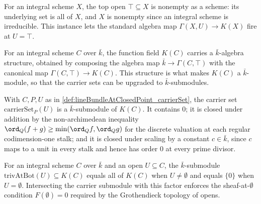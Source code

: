 \begin{definition}
  \label{def:lineBundleAtClosedPoint_instNonemptyTopOpen}
  For an integral scheme \(X\), the top open \(\top \subseteq X\) is nonempty
  as a scheme: its underlying set is all of \(X\), and \(X\) is nonempty since
  an integral scheme is irreducible. This instance lets the standard algebra
  map \(\Gamma(X, U) \to K(X)\) fire at \(U = \top\).
\end{definition}

\begin{definition}
  \label{def:lineBundleAtClosedPoint_instAlgebraKbarFunctionField}
  For an integral scheme \(C\) over \(\bar k\), the function field \(K(C)\)
  carries a \(\bar k\)-algebra structure, obtained by composing the algebra
  map \(\bar k \to \Gamma(C, \top)\) with the canonical map
  \(\Gamma(C, \top) \to K(C)\). This structure is what makes \(K(C)\) a
  \(\bar k\)-module, so that the carrier sets can be upgraded to
  \(\bar k\)-submodules.
\end{definition}

\begin{definition}
  \label{def:lineBundleAtClosedPoint_carrierSubmodule}
  With \(C, P, U\) as in \cref{def:lineBundleAtClosedPoint_carrierSet}, the
  carrier set \(\mathrm{carrierSet}_P(U)\) is a \(\bar k\)-submodule of
  \(K(C)\). It contains \(0\); it is closed under addition by the
  non-archimedean inequality \(\ord_Q(f + g) \ge \min(\ord_Q f, \ord_Q g)\)
  for the discrete valuation at each regular codimension-one stalk; and it is
  closed under scaling by a constant \(c \in \bar k\), since \(c\) maps to a
  unit in every stalk and hence has order \(0\) at every prime divisor.
\end{definition}

\begin{definition}
  \label{def:lineBundleAtClosedPoint_trivAtBot}
  For an integral scheme \(C\) over \(\bar k\) and an open \(U \subseteq C\),
  the \(\bar k\)-submodule \(\mathrm{trivAtBot}(U) \subseteq K(C)\) equals all
  of \(K(C)\) when \(U \ne \emptyset\) and equals \(\{0\}\) when
  \(U = \emptyset\). Intersecting the carrier submodule with this factor
  enforces the sheaf-at-\(\emptyset\) condition \(F(\emptyset) = 0\) required
  by the Grothendieck topology of opens.
\end{definition}


